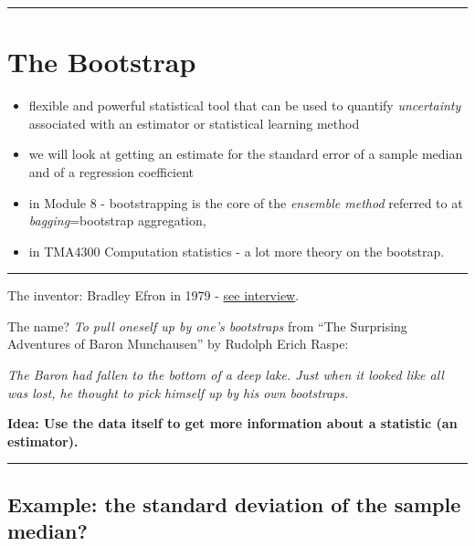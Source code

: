 \documentclass[]{article}
\providecommand{\tightlist}{%
  \setlength{\itemsep}{0pt}\setlength{\parskip}{0pt}}
\begin{document}
\begin{center}\rule{0.5\linewidth}{\linethickness}\end{center}

\hypertarget{the-bootstrap}{%
\section{The Bootstrap}\label{the-bootstrap}}

\begin{itemize}
\tightlist
\item
  flexible and powerful statistical tool that can be used to quantify
  \emph{uncertainty} associated with an estimator or statistical
  learning method
\item
  we will look at getting an estimate for the standard error of a sample
  median and of a regression coefficient
\item
  in Module 8 - bootstrapping is the core of the \emph{ensemble method}
  referred to at \emph{bagging}=bootstrap aggregation,
\item
  in TMA4300 Computation statistics - a lot more theory on the
  bootstrap.
\end{itemize}

\begin{center}\rule{0.5\linewidth}{\linethickness}\end{center}

The inventor: Bradley Efron in 1979 -
\href{https://www.youtube.com/watch?v=6l9V1sINzhE}{see interview}.

The name? \emph{To pull oneself up by one's bootstraps} from ``The
Surprising Adventures of Baron Munchausen'' by Rudolph Erich Raspe:

\emph{The Baron had fallen to the bottom of a deep lake. Just when it
looked like all was lost, he thought to pick himself up by his own
bootstraps.}

\textbf{Idea: Use the data itself to get more information about a
statistic (an estimator).}

\begin{center}\rule{0.5\linewidth}{\linethickness}\end{center}

\hypertarget{example-the-standard-deviation-of-the-sample-median}{%
\subsection{Example: the standard deviation of the sample
median?}\label{example-the-standard-deviation-of-the-sample-median}}
\end{document}
